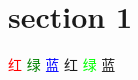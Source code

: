 \documentclass[12pt]{article}
\begin{document}
    \section{section 1}
    \textcolor{Red}{红}
    \textcolor{Green}{绿}
    \textcolor{Blue}{蓝}
    \textcolor[RGB]{255,0,0}{红}
    \textcolor[HTML]{00FF00}{绿}
    \textcolor[rgb]{0,0,1}{蓝}
    
    \colorbox{Lavender}{}
    \colorbox{SkyBlue}{}
    \colorbox{Wheat}{}
\end{document}
